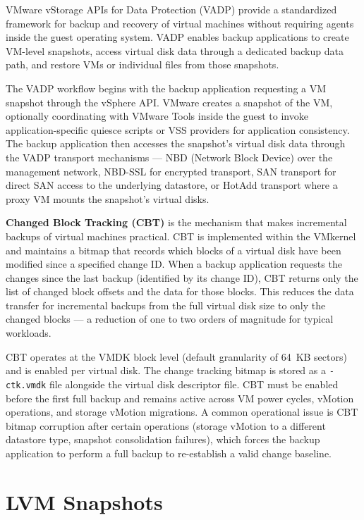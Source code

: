 VMware vStorage APIs for Data Protection (VADP) provide a standardized framework for backup and recovery of virtual machines without requiring agents inside the guest operating system. VADP enables backup applications to create VM-level snapshots, access virtual disk data through a dedicated backup data path, and restore VMs or individual files from those snapshots.

The VADP workflow begins with the backup application requesting a VM snapshot through the vSphere API. VMware creates a snapshot of the VM, optionally coordinating with VMware Tools inside the guest to invoke application-specific quiesce scripts or VSS providers for application consistency. The backup application then accesses the snapshot's virtual disk data through the VADP transport mechanisms --- NBD (Network Block Device) over the management network, NBD-SSL for encrypted transport, SAN transport for direct SAN access to the underlying datastore, or HotAdd transport where a proxy VM mounts the snapshot's virtual disks.

\textbf{Changed Block Tracking (CBT)} is the mechanism that makes incremental backups of virtual machines practical. CBT is implemented within the VMkernel and maintains a bitmap that records which blocks of a virtual disk have been modified since a specified change ID. When a backup application requests the changes since the last backup (identified by its change ID), CBT returns only the list of changed block offsets and the data for those blocks. This reduces the data transfer for incremental backups from the full virtual disk size to only the changed blocks --- a reduction of one to two orders of magnitude for typical workloads.

CBT operates at the VMDK block level (default granularity of 64~KB sectors) and is enabled per virtual disk. The change tracking bitmap is stored as a \texttt{-ctk.vmdk} file alongside the virtual disk descriptor file. CBT must be enabled before the first full backup and remains active across VM power cycles, vMotion operations, and storage vMotion migrations. A common operational issue is CBT bitmap corruption after certain operations (storage vMotion to a different datastore type, snapshot consolidation failures), which forces the backup application to perform a full backup to re-establish a valid change baseline.

\section{LVM Snapshots}

